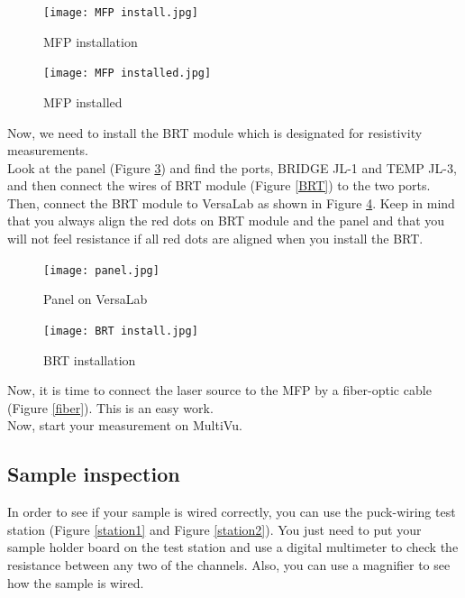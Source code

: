 \documentclass{article}
\begin{document}
            \begin{figure}[H]
                \centering
                \texttt{[image: MFP install.jpg]}
                \caption{MFP installation}
                \label{MFP install}
            \end{figure}

            \begin{figure}[H]
                \centering
                \texttt{[image: MFP installed.jpg]}
                \caption{MFP installed}
                \label{MFP installed}
            \end{figure}

            Now, we need to install the BRT module which is designated for resistivity measurements.\\
            Look at the panel (Figure \ref{panel}) and find the ports, BRIDGE JL-1 and TEMP JL-3, and then connect the wires of BRT module (Figure \ref{BRT}) to the two ports. Then, connect the BRT module to VersaLab as shown in Figure \ref{BRT install}. Keep in mind that you always align the red dots on BRT module and the panel and that you will not feel resistance if all red dots are aligned when you install the BRT.\\


            \begin{figure}[H]
                \centering
                \texttt{[image: panel.jpg]}
                \caption{Panel on VersaLab}
                \label{panel}
            \end{figure}

            \begin{figure}[H]
                \centering
                \texttt{[image: BRT install.jpg]}
                \caption{BRT installation}
                \label{BRT install}
            \end{figure}

            Now, it is time to connect the laser source to the MFP by a fiber-optic cable (Figure \ref{fiber}). This is an easy work.\\

            Now, start your measurement on MultiVu.
            
    \subsection{Sample inspection}

    In order to see if your sample is wired correctly, you can use the puck-wiring test station (Figure \ref{station1} and Figure \ref{station2}). You just need to put your sample holder board on the test station and use a digital multimeter to check the resistance between any two of the channels. Also, you can use a magnifier to see how the sample is wired.
\end{document}

